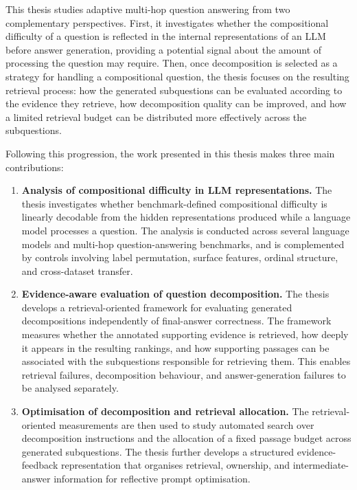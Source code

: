 This thesis studies adaptive multi-hop question answering from two
complementary perspectives. First, it investigates whether the compositional
difficulty of a question is reflected in the internal representations of an LLM
before answer generation, providing a potential signal about the amount of
processing the question may require. Then, once decomposition is selected as a
strategy for handling a compositional question, the thesis focuses on the
resulting retrieval process: how the generated subquestions can be evaluated
according to the evidence they retrieve, how decomposition quality can be
improved, and how a limited retrieval budget can be distributed more
effectively across the subquestions.

Following this progression, the work presented in this thesis makes three main
contributions:

\begin{enumerate}

    \item \textbf{Analysis of compositional difficulty in LLM
    representations.}
    The thesis investigates whether benchmark-defined compositional difficulty
    is linearly decodable from the hidden representations produced while a
    language model processes a question. The analysis is conducted across
    several language models and multi-hop question-answering benchmarks, and is
    complemented by controls involving label permutation, surface features,
    ordinal structure, and cross-dataset transfer.

    \item \textbf{Evidence-aware evaluation of question decomposition.}
    The thesis develops a retrieval-oriented framework for evaluating generated
    decompositions independently of final-answer correctness. The framework
    measures whether the annotated supporting evidence is retrieved, how deeply
    it appears in the resulting rankings, and how supporting passages can be
    associated with the subquestions responsible for retrieving them. This
    enables retrieval failures, decomposition behaviour, and answer-generation
    failures to be analysed separately.

    \item \textbf{Optimisation of decomposition and retrieval allocation.}
    The retrieval-oriented measurements are then used to study automated search
    over decomposition instructions and the allocation of a fixed passage
    budget across generated subquestions. The thesis further develops a
    structured evidence-feedback representation that organises retrieval,
    ownership, and intermediate-answer information for reflective prompt
    optimisation.
    
\end{enumerate}

